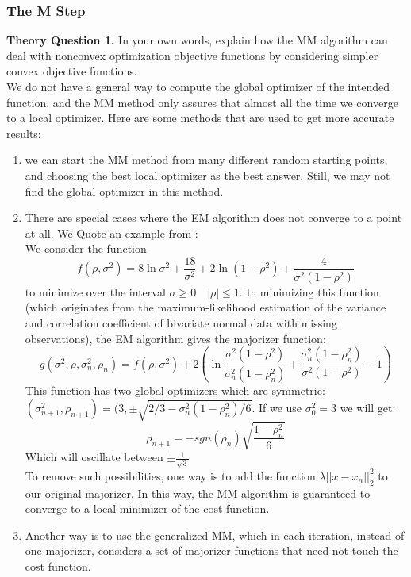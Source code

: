 \documentclass[11pt,a4paper]{article}
\begin{document}
	\subsubsection{The M Step}
	\color{blue}
	\large{\textbf{Theory Question 1.}} In your own words, explain how the MM algorithm can deal with nonconvex
optimization objective functions by considering simpler convex objective functions.
	\color{black}
	\\
	We do not have a general way to compute the global optimizer of the intended function, and the MM method only assures that almost all the time we converge to a local optimizer. Here are some methods that are used to get more accurate results:
	\begin{enumerate}
	\item we can start the MM method from many different random starting points, and choosing the best local optimizer as the best answer. Still, we may not find the global optimizer in this method.
	\item There are special cases where the EM algorithm does not converge to a point at all. We Quote an example from \cite{Article}: \\
	We consider the function 
	\begin{equation*}
	f(\rho,\sigma^2)=8\ln \sigma^2+\frac{18}{\sigma^2}+2\ln (1-\rho^2)+\frac{4}{\sigma^2(1-\rho^2)}
	\end{equation*}
	to minimize over the interval $\sigma\geq 0 \quad |\rho|\leq 1$.
	In minimizing this function  (which originates from the maximum-likelihood estimation of the variance and correlation coefficient of bivariate normal data with missing observations), the EM algorithm gives the majorizer function:
	\begin{equation*}
	g(\sigma^2,\rho,\sigma_n^2,\rho_n)=f(\rho,\sigma^2)+2(\ln \frac{\sigma^2(1-\rho^2)}{\sigma_n^2(1-\rho_n^2)} +\frac{\sigma_n^2(1-\rho_n^2)}{\sigma^2(1-\rho^2)}-1)
	\end{equation*}
	This function has two global optimizers which are symmetric: $(\sigma^2_{n+1},\rho_{n+1})=(3,\pm \sqrt{2/3-\sigma_n^2(1-\rho_n^2)/6}$. If we use $\sigma_0^2=3$ we will get:
		\begin{equation*}
	\rho_{n+1}=-sgn(\rho_n)\sqrt{\frac{1-\rho_n^2}{6}}
	\end{equation*}
	Which will oscillate between $\pm \frac{1}{\sqrt{3}}$\\
	To remove such possibilities, one way is to add the function $\lambda ||x-x_n||_2^2$ to our original majorizer. In this way, the MM algorithm is guaranteed to converge to a local minimizer of the cost function.
	\item Another way is to use the generalized MM, which in each iteration, instead of one majorizer, considers a set of majorizer functions that need not touch the cost function. 
	\end{enumerate}	 
\end{document}
